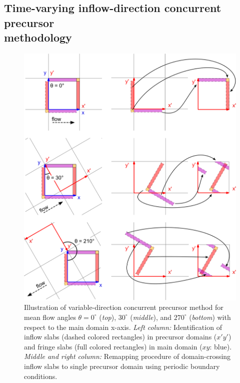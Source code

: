 	\subsection{Time-varying inflow-direction concurrent precursor\\methodology}\label{subsec:timevaryingCP}
	\begin{figure}[t]
		\centering
		\includegraphics[width=\textwidth]{chapters/turbulent_inflow/blm/figure5.eps}
		\caption{Illustration of variable-direction concurrent precursor method for mean flow angles $\theta = 0^\circ$ (\emph{top}), $30^\circ$ (\emph{middle}), and $270^\circ$ (\emph{bottom}) with respect to the main domain x-axis. \emph{Left column: }Identification of inflow slabs (dashed colored rectangles) in precursor domains ($x'y'$) and fringe slabs (full colored rectangles) in main domain ($xy$: blue). \emph{Middle and right column: } Remapping procedure of domain-crossing inflow slabs to single precursor domain using periodic boundary conditions.}
		\label{fig:ConcurrentPrecursorRemapping}
	\end{figure}
	
